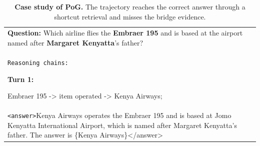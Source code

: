 \begin{table}[ht]
\centering
\footnotesize
\setlength{\tabcolsep}{8pt}
\renewcommand{\arraystretch}{1.3}
\caption{\textbf{Case study of PoG.} The trajectory reaches the correct answer through a shortcut retrieval and misses the bridge evidence.}

\begin{tabular}{>{\raggedright\arraybackslash}p{}}
\rowcolor{gray!20}
\textbf{Question:} Which airline flies the \textbf{Embraer 195} and is based at the airport named after \textbf{Margaret Kenyatta}'s father? \\[4pt]

\rowcolor{blue!10}
\texttt{Reasoning chains:}

\textbf{Turn 1:}

  Embraer 195 -> item operated -> Kenya Airways;\\
  
\rowcolor{red!30}
\texttt{<answer>}Kenya Airways operates the Embraer 195 and is based at Jomo Kenyatta International Airport, which is named after Margaret Kenyatta's father. The answer is \{Kenya Airways\}{</answer>}\\
\end{tabular}

\label{tab:pogcase}
\end{table}